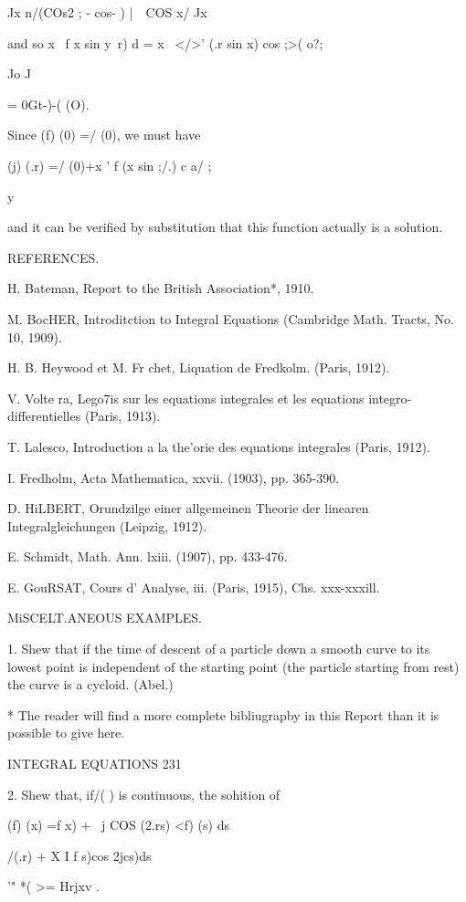 {Jx n/(COs2 ;  - cos-  ) |\  \ COS x/ Jx 

and so x \ f  x sin y\ r) d  = x \ </>' (.r sin x) cos ;>( o?;  

Jo J 

= 0Gt-)-( (O). 

Since (f) (0) =/ (0), we must have 

(j) (.r) =/ (0)+x ' f (x sin ;/.) c a/  ; 

y 

and it can be verified by substitution that this function actually is a solution. 



REFERENCES. 

H. Bateman, Report to the British Association*, 1910. 

M. BocHER, Introditction to Integral Equations (Cambridge Math. Tracts, No. 10, 
1909). 

H. B. Heywood et M. Fr chet, Liquation de Fredkolm. (Paris, 1912). 

V. Volte ra, Lego7is sur les equations integrales et les equations integro-differentielles 
(Paris, 1913). 

T. Lalesco, Introduction a la the'orie des equations integrales (Paris, 1912). 

I. Fredholm, Acta Mathematica, xxvii. (1903), pp. 365-390. 

D. HiLBERT, Orundzilge einer allgemeinen Theorie der linearen Integralgleichungen 
(Leipzig, 1912). 

E. Schmidt, Math. Ann. lxiii. (1907), pp. 433-476. 

E. GouRSAT, Cours d' Analyse, iii. (Paris, 1915), Chs. xxx-xxxill. 

MiSCELT.ANEOUS EXAMPLES. 

1. Shew that if the time of descent of a particle down a smooth curve to its lowest 
point is independent of the starting point (the particle starting from rest) the curve is a 
cycloid. (Abel.) 

* The reader will find a more complete bibliugrapby in this Report than it is possible to give 
here. 



INTEGRAL EQUATIONS 231 

2. Shew that, if/( ) is continuous, the sohition of 

(f) (x) =f  x) + \ j COS (2.rs) <f) (s) ds 

/(.r) + X I f s)cos 2jcs)ds 

'" *( >= Hrjxv . 

}
